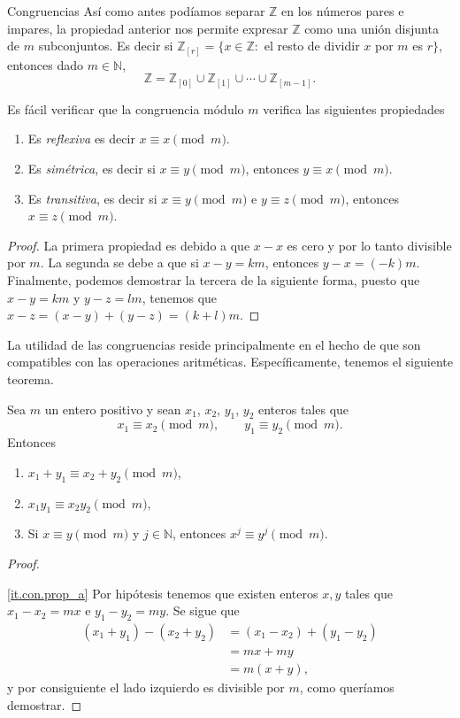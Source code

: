 \begin{section}{Congruencias}
Así como antes podíamos separar $\mathbb Z$ en los números pares e impares, la propiedad anterior nos permite expresar $\mathbb Z$ como una unión disjunta de $m$ subconjuntos. Es decir si $\mathbb  Z_{[r]} =\{x \in \mathbb Z:$ el resto de dividir $x$ por $m$ es $r\}$, entonces dado $m \in \mathbb N$, 
$$
\mathbb Z= \mathbb Z_{[0]}\cup \mathbb Z_{[1]}\cup \cdots\cup \mathbb Z_{[m-1]}.
$$

Es fácil verificar que la {congruencia módulo} $m$ verifica las siguientes propiedades
\begin{enumerate}[label=\textit{\alph*)}]
\item
Es \textit{{reflexiva}} es decir $x\equiv x\pmod{m}$.
\item
Es \textit{{simétrica}}, es decir si $x \equiv y \pmod{m}$, entonces
$y \equiv x \pmod{m}$.
\item
Es \textit{{ transitiva}}, es decir si $x\equiv y \pmod{m}$ e
$y\equiv z \pmod{m}$, entonces $x\equiv z \pmod{m}$.
\end{enumerate}
\begin{proof}
La primera propiedad es debido a que $x-x$ es cero y por lo tanto divisible por $m$. La segunda se debe a que si $x-y=km$, entonces $y-x=(-k)m$. Finalmente, podemos demostrar la tercera de la siguiente forma,  puesto que $x-y=km$ y $y-z=lm$, tenemos que $x-z=(x-y)+(y-z)=(k+l)m$.
\end{proof}


La utilidad de las congruencias reside principalmente en el hecho de que son compatibles con las operaciones aritméticas. Específicamente, tenemos el siguiente teorema.

\begin{teorema}\label{t4.1} Sea $m$ un entero positivo y sean $x_1$, $x_2$,
$y_1$, $y_2$ enteros tales que
$$
x_1 \equiv x_2 \pmod{m}, \qquad y_1 \equiv y_2 \pmod{m}.
$$
Entonces
\begin{enumerate}[label=\textit{\alph*)}]
\item\label{it.con.prop_a} $ x_1+ y_1 \equiv x_2+ y_2 \pmod{m}$,
\item\label{it.con.prop_b}  $x_1 y_1 \equiv x_2 y_2 \pmod{m}$,
\item\label{it.con.prop_c}  Si $x \equiv y \pmod{m}$  y $j \in  \mathbb N$, entonces $x^j \equiv y^j \pmod{m}$.
\end{enumerate}
\end{teorema}
\begin{proof}
\

\ref{it.con.prop_a} Por hipótesis tenemos que existen enteros
$x,y$ tales que $x_1-x_2=mx$ e $y_1-y_2=my$. Se sigue que
$$
\begin{aligned}
(x_1+y_1)-(x_2+y_2) &= (x_1-x_2)+ (y_1 -y_2) \\
&= mx +my \\
&= m(x+y),
\end{aligned}
$$
y por consiguiente el lado izquierdo es divisible por $m$, como
queríamos demostrar.


\end{proof}
\end{section}
